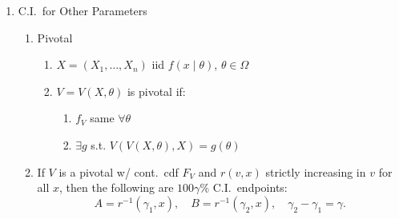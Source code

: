 \documentclass[11pt]{article}
\begin{document}
\begin{enumerate}[label=\Roman*.]
  \begin{enumerate}[label=\Alph*.]
    \item Def:
    \begin{enumerate}[label=\arabic*.]
      \item Lower $100\gamma\%$ C.I.\ for $g(\theta)$: $(A,\infty)$ s.t. $P(A<g(\theta))\ge \gamma$
      \item Upper $100\gamma\%$ C.I.\ for $g(\theta)$: $(-\infty,B)$ s.t. $P(g(\theta)<B)\ge \gamma$
    \end{enumerate}
    \item $P(A<g(\theta))=\gamma$ or $P(g(\theta)<B)=\gamma$ called exact lower/upper C.I.
    \item Normal dist'n w/ unknown $\sigma^{2}$
    \[
      X_{1},\dots,X_{n}\ \text{iid}\ N(\mu,\sigma^{2})\Rightarrow \forall\gamma\in(0,1):
    \]
    \[
      A=\bar X_{n}-t^{-1}_{n-1}(\gamma)\frac{s}{\sqrt{n}},\quad
      B=\bar X_{n}+t^{-1}_{n-1}(\gamma)\frac{s}{\sqrt{n}}.
    \]
  \end{enumerate}
  \item C.I.\ for Other Parameters
  \begin{enumerate}[label=\Alph*.]
    \item Pivotal
    \begin{enumerate}[label=\arabic*.]
      \item $X=(X_{1},\dots,X_{n})$ iid $f(x\mid\theta)$, $\theta\in\Omega$
      \item $V=V(X,\theta)$ is pivotal if:
      \begin{enumerate}[label=\alph*)]
        \item $f_{V}$ same $\forall\theta$
        \item $\exists g$ s.t. $V(V(X,\theta),X)=g(\theta)$
      \end{enumerate}
    \end{enumerate}
    \item If $V$ is a pivotal w/ cont.\ cdf $F_{V}$ and $r(v,x)$ strictly increasing in $v$ for all $x$,
    then the following are $100\gamma\%$ C.I.\ endpoints:
    \[
      A=r^{-1}(\gamma_{1},x),\quad B=r^{-1}(\gamma_{2},x),\quad \gamma_{2}-\gamma_{1}=\gamma.
    \]
  \end{enumerate}
\end{enumerate}
\end{document}
